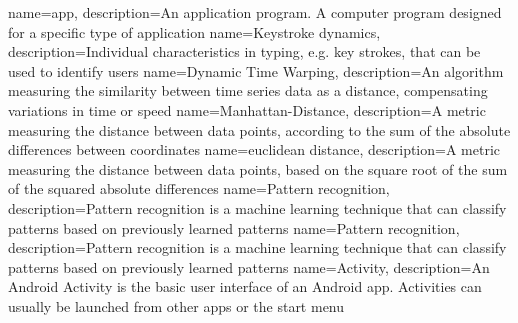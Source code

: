  {
  name=app,
  description={An application program. A computer program designed for a specific type of application}
}
 {
  name=Keystroke dynamics,
  description={Individual characteristics in typing, e.g. key strokes, that can be used to identify users}
}
 {
  name=Dynamic Time Warping,
  description={An algorithm measuring the similarity between time series data as a distance, compensating variations in time or speed}
}
 {
  name=Manhattan-Distance,
  description={A metric measuring the distance between data points, according to the sum of the absolute differences between coordinates}
}
 {
  name=euclidean distance,
  description={A metric measuring the distance between data points, based on the square root of the sum of the squared absolute differences}
}
 {
  name=Pattern recognition,
  description={Pattern recognition is a machine learning technique that can classify patterns based on previously learned patterns}
}
 {
  name=Pattern recognition,
  description={Pattern recognition is a machine learning technique that can classify patterns based on previously learned patterns}
}
 {
  name=Activity,
  description={An Android Activity is the basic user interface of an Android \gls{app}. Activities can usually be launched from other \glspl{app} or the start menu}
}
